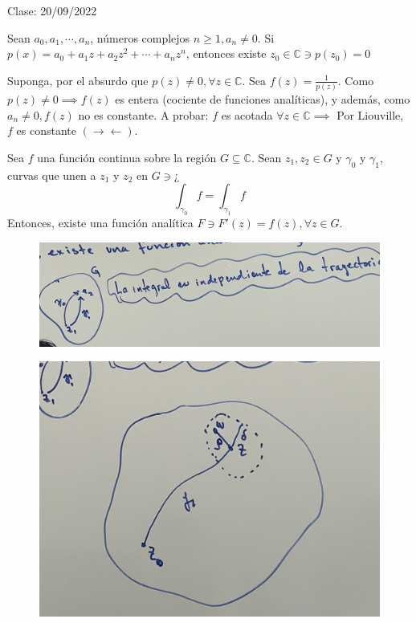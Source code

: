 Clase: 20/09/2022

\begin{teorema}
    Sean $a_0,a_1,\cdots, a_n$, números complejos $n\geq 1,a_n\neq 0$. Si $p(x)=a_0+a_1z+a_2z^2+\cdots + a_nz^n$, entonces existe $z_0\in\mathbb{C}\ni p(z_0)=0$
    \begin{dem}
        Suponga, por el absurdo que $p(z)\neq 0,\forall z\in \mathbb{C}$. Sea $f(z)=\frac{1}{p(z)}$. Como $p(z)\neq 0\implies f(z)$ es entera (cociente de funciones analíticas), y además, como $a_n\neq 0,f(z)$ no es constante. A probar: $f$ es acotada $\forall z\in \mathbb{C}\implies$ Por Liouville, $f$ es constante $(\to\gets)$. 
    \end{dem} 
\end{teorema}

\begin{lema}
    Sea $f$ una función continua sobre la región $G\subseteq \mathbb{C}$. Sean $z_1,z_2\in G$ y $\gamma_0$ y $\gamma_1$, curvas que unen a $z_1$ y $z_2$ en $G\ni ¿$
    $$\int_{\gamma_0}f=\int_{\gamma_1}f$$
    Entonces, existe una función analítica $F\ni F'(z)=f(z),\forall z\in G$. 
    \begin{figure}[H]
        \includegraphics[scale=0.2]{imagenes/15.jpeg}
    \end{figure}
    \begin{dem}
        \begin{figure}[H]
            \centering
            \includegraphics[scale=0.1]{imagenes/15.1.jpeg}

\end{figure}
\end{dem}
\end{lema}
